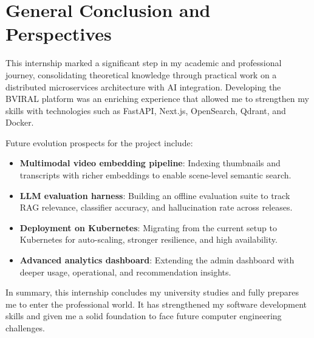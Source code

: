 \chapter*{General Conclusion and Perspectives}

This internship marked a significant step in my academic and professional journey, consolidating
theoretical knowledge through practical work on a distributed microservices architecture with AI
integration. Developing the BVIRAL platform was an enriching experience that allowed me to
strengthen my skills with technologies such as FastAPI, Next.js, OpenSearch, Qdrant, and Docker.

Future evolution prospects for the project include:
\begin{itemize}
  \item \textbf{Multimodal video embedding pipeline}: Indexing thumbnails and transcripts with
    richer embeddings to enable scene-level semantic search.
  \item \textbf{LLM evaluation harness}: Building an offline evaluation suite to track RAG
    relevance, classifier accuracy, and hallucination rate across releases.
  \item \textbf{Deployment on Kubernetes}: Migrating from the current setup to Kubernetes for
    auto-scaling, stronger resilience, and high availability.
  \item \textbf{Advanced analytics dashboard}: Extending the admin dashboard with deeper usage,
    operational, and recommendation insights.
\end{itemize}

In summary, this internship concludes my university studies and fully prepares me to enter the
professional world. It has strengthened my software development skills and given me a solid
foundation to face future computer engineering challenges.

